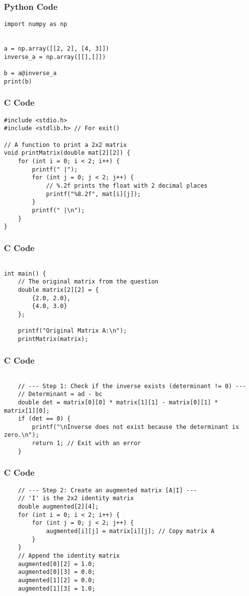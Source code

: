 \documentclass{beamer}
\begin{document}
\begin{frame}[fragile]
    \frametitle{Python Code}
    \begin{lstlisting}
import numpy as np


a = np.array([[2, 2], [4, 3]])
inverse_a = np.array([[],[]])

b = a@inverse_a
print(b)
    \end{lstlisting}
\end{frame}



\begin{frame}[fragile]
\frametitle{C Code}
\begin{lstlisting}
#include <stdio.h>
#include <stdlib.h> // For exit()

// A function to print a 2x2 matrix
void printMatrix(double mat[2][2]) {
    for (int i = 0; i < 2; i++) {
        printf(" |");
        for (int j = 0; j < 2; j++) {
            // %.2f prints the float with 2 decimal places
            printf("%8.2f", mat[i][j]);
        }
        printf(" |\n");
    }
}
\end{lstlisting}
\end{frame}

\begin{frame}[fragile]
\frametitle{C Code}
\begin{lstlisting}
   
int main() {
    // The original matrix from the question
    double matrix[2][2] = {
        {2.0, 2.0},
        {4.0, 3.0}
    };

    printf("Original Matrix A:\n");
    printMatrix(matrix);
\end{lstlisting}
\end{frame}

\begin{frame}[fragile]
\frametitle{C Code}
\begin{lstlisting}
   
    // --- Step 1: Check if the inverse exists (determinant != 0) ---
    // Determinant = ad - bc
    double det = matrix[0][0] * matrix[1][1] - matrix[0][1] * matrix[1][0];
    if (det == 0) {
        printf("\nInverse does not exist because the determinant is zero.\n");
        return 1; // Exit with an error
    }
\end{lstlisting}
\end{frame}

\begin{frame}[fragile]
\frametitle{C Code}
\begin{lstlisting}
    // --- Step 2: Create an augmented matrix [A|I] ---
    // 'I' is the 2x2 identity matrix
    double augmented[2][4];
    for (int i = 0; i < 2; i++) {
        for (int j = 0; j < 2; j++) {
            augmented[i][j] = matrix[i][j]; // Copy matrix A
        }
    }
    // Append the identity matrix
    augmented[0][2] = 1.0;
    augmented[0][3] = 0.0;
    augmented[1][2] = 0.0;
    augmented[1][3] = 1.0;
\end{lstlisting}
\end{frame}
\end{document}
